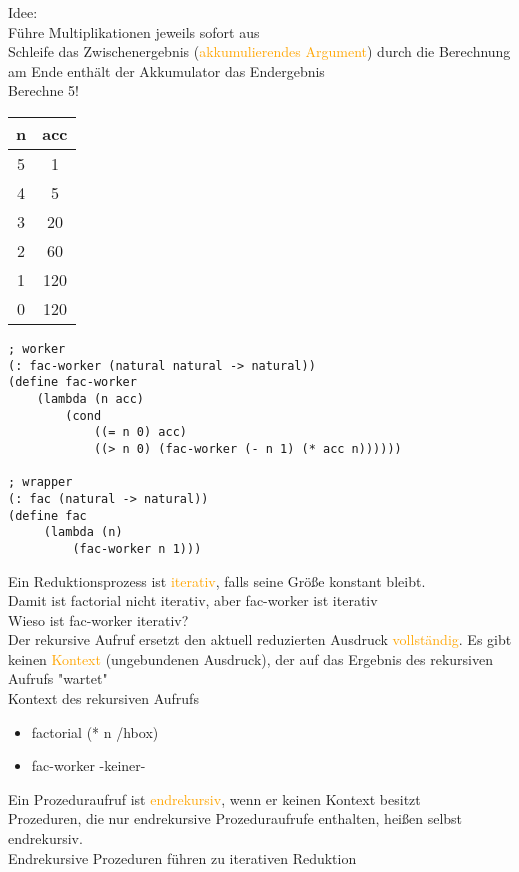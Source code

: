 \documentclass[paper=a4, fontsize=11pt]{scrartcl}
\numberwithin{equation}{section}
\numberwithin{figure}{section}
\numberwithin{table}{section}
\begin{document}
\begin{lstlistig}
Idee: \\
Führe Multiplikationen jeweils sofort aus \\
Schleife das Zwischenergebnis (\textcolor{orange}{akkumulierendes Argument}) durch die Berechnung \\
am Ende enthält der Akkumulator das Endergebnis \\

Berechne 5! \\
\begin{tabular}{c|c}
n & acc \\\hline
5 & 1 \\
4 & 5 \\
3 & 20 \\
2 & 60 \\
1 & 120 \\
0 & 120 \\
\end{tabular} 

\begin{lstlisting}
; worker
(: fac-worker (natural natural -> natural))
(define fac-worker
    (lambda (n acc)
        (cond
            ((= n 0) acc)
            ((> n 0) (fac-worker (- n 1) (* acc n))))))
            
; wrapper
(: fac (natural -> natural))
(define fac
     (lambda (n)
         (fac-worker n 1)))            
\end{lstlisting}

Ein Reduktionsprozess ist \textcolor{orange}{iterativ}, falls seine Größe konstant bleibt. \\
Damit ist factorial nicht iterativ, aber fac-worker ist iterativ \\

Wieso ist fac-worker iterativ? \\
Der rekursive Aufruf ersetzt den aktuell reduzierten Ausdruck \textcolor{orange}{vollständig}. Es gibt keinen \textcolor{orange}{Kontext} (ungebundenen Ausdruck), der auf das Ergebnis des rekursiven Aufrufs "wartet" \\
Kontext des rekursiven Aufrufs \\
\begin{itemize}
\item factorial (* n /hbox)
\item fac-worker -keiner-
\end{itemize}

Ein Prozeduraufruf ist \textcolor{orange}{endrekursiv}, wenn er keinen Kontext besitzt \\
Prozeduren, die nur endrekursive Prozeduraufrufe enthalten, heißen selbst endrekursiv. \\
Endrekursive Prozeduren führen zu iterativen Reduktion \\


\end{lstlistig}
\end{document}

